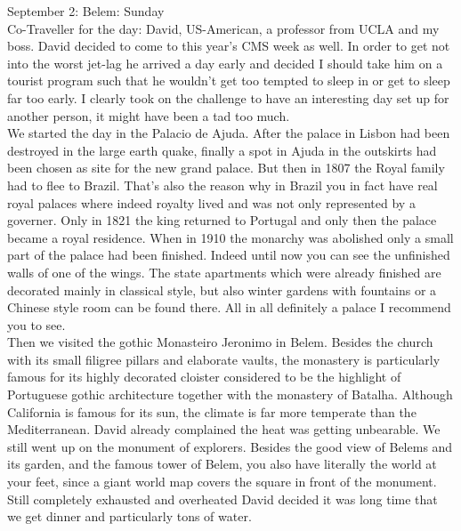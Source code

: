 September 2: Belem: Sunday\\
Co-Traveller for the day: David, US-American, a professor from UCLA and my boss. David decided to come to this year's CMS week as well. In order to get not into the worst jet-lag he arrived a day early and decided I should take him on a tourist program such that he wouldn't get too tempted to sleep in or get to sleep far too early. I clearly took on the challenge to have an interesting day set up for another person, it might have been a tad too much.\\

We started the day in the Palacio de Ajuda. After the palace in Lisbon had been destroyed in the large earth quake, finally a spot in Ajuda in the outskirts had been chosen as site for the new grand palace. But then in 1807 the Royal family had to flee to Brazil. That's also the reason why in Brazil you in fact have real royal palaces where indeed royalty lived and was not only represented by a governer. Only in 1821 the king returned to Portugal and only then the palace became a royal residence. When in 1910 the monarchy was abolished only a small part of the palace had been finished. Indeed until now you can see the unfinished walls of one of the wings. The state apartments which were already finished are decorated mainly in classical style, but also winter gardens with fountains or a Chinese style room can be found there. All in all definitely a palace I recommend you to see. \\
Then we visited the gothic Monasteiro Jeronimo in Belem. Besides the church with its small filigree pillars and elaborate vaults, the monastery is particularly famous for its highly decorated cloister considered to be the highlight of Portuguese gothic architecture together with the monastery of Batalha. Although California is famous for its sun, the climate is far more temperate than the Mediterranean. David already complained the heat was getting unbearable. We still went up on the monument of explorers. Besides the good view of Belems and its garden, and the famous tower of Belem, you also have literally the world at your feet, since a giant world map covers the square in front of the monument. Still completely exhausted and overheated David decided it was long time that we get dinner and particularly tons of water. \\
